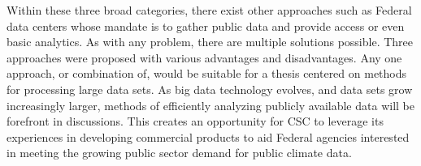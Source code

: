 Within these three broad categories, there exist other approaches such as Federal data centers whose mandate is to gather public data and provide access or even basic analytics. As with any problem, there are multiple solutions possible.  Three approaches were proposed with various advantages and disadvantages. Any one approach, or combination of, would be suitable for a thesis centered on methods for processing large data sets. As big data technology evolves, and data sets grow increasingly larger, methods of efficiently analyzing publicly available data will be forefront in discussions. This creates an opportunity for \textsc{CSC} to leverage its experiences in developing commercial products to aid Federal agencies interested in meeting the growing public sector demand for public climate data.